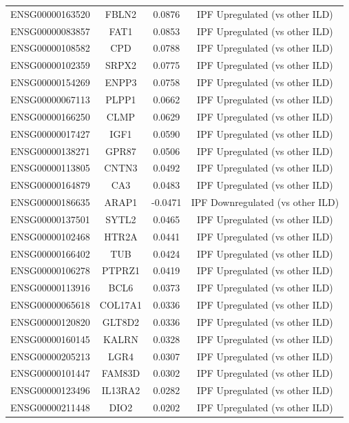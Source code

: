 \documentclass[
]{article}
\begin{document}
\begin{singlespace}
\begin{longtable}[t]{lccc}
ENSG00000163520 & FBLN2 & 0.0876 & IPF Upregulated (vs other ILD)\\
\addlinespace
ENSG00000083857 & FAT1 & 0.0853 & IPF Upregulated (vs other ILD)\\
ENSG00000108582 & CPD & 0.0788 & IPF Upregulated (vs other ILD)\\
ENSG00000102359 & SRPX2 & 0.0775 & IPF Upregulated (vs other ILD)\\
ENSG00000154269 & ENPP3 & 0.0758 & IPF Upregulated (vs other ILD)\\
ENSG00000067113 & PLPP1 & 0.0662 & IPF Upregulated (vs other ILD)\\
\addlinespace
ENSG00000166250 & CLMP & 0.0629 & IPF Upregulated (vs other ILD)\\
ENSG00000017427 & IGF1 & 0.0590 & IPF Upregulated (vs other ILD)\\
ENSG00000138271 & GPR87 & 0.0506 & IPF Upregulated (vs other ILD)\\
ENSG00000113805 & CNTN3 & 0.0492 & IPF Upregulated (vs other ILD)\\
ENSG00000164879 & CA3 & 0.0483 & IPF Upregulated (vs other ILD)\\
\addlinespace
ENSG00000186635 & ARAP1 & -0.0471 & IPF Downregulated (vs other ILD)\\
ENSG00000137501 & SYTL2 & 0.0465 & IPF Upregulated (vs other ILD)\\
ENSG00000102468 & HTR2A & 0.0441 & IPF Upregulated (vs other ILD)\\
ENSG00000166402 & TUB & 0.0424 & IPF Upregulated (vs other ILD)\\
ENSG00000106278 & PTPRZ1 & 0.0419 & IPF Upregulated (vs other ILD)\\
\addlinespace
ENSG00000113916 & BCL6 & 0.0373 & IPF Upregulated (vs other ILD)\\
ENSG00000065618 & COL17A1 & 0.0336 & IPF Upregulated (vs other ILD)\\
ENSG00000120820 & GLT8D2 & 0.0336 & IPF Upregulated (vs other ILD)\\
ENSG00000160145 & KALRN & 0.0328 & IPF Upregulated (vs other ILD)\\
ENSG00000205213 & LGR4 & 0.0307 & IPF Upregulated (vs other ILD)\\
\addlinespace
ENSG00000101447 & FAM83D & 0.0302 & IPF Upregulated (vs other ILD)\\
ENSG00000123496 & IL13RA2 & 0.0282 & IPF Upregulated (vs other ILD)\\
ENSG00000211448 & DIO2 & 0.0202 & IPF Upregulated (vs other ILD)\\

\end{longtable}
\end{singlespace}
\end{document}
